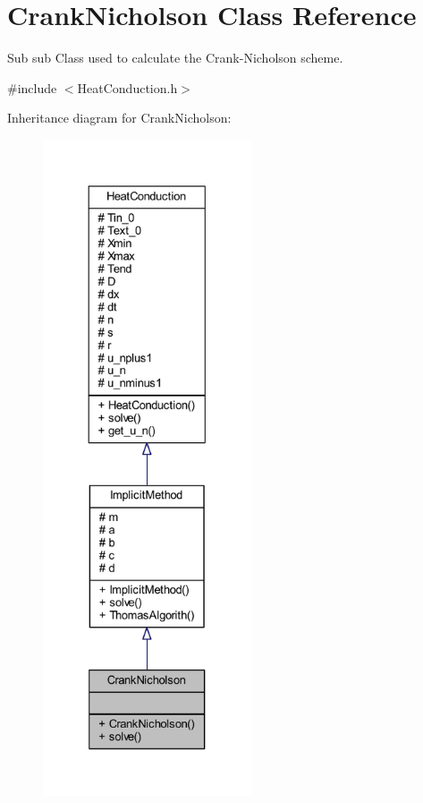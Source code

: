 \hypertarget{class_crank_nicholson}{}\section{Crank\+Nicholson Class Reference}
\label{class_crank_nicholson}


Sub sub Class used to calculate the Crank-\/\+Nicholson scheme.  




{\ttfamily \#include $<$Heat\+Conduction.\+h$>$}



Inheritance diagram for Crank\+Nicholson\+:
\nopagebreak
\begin{figure}[H]
\begin{center}
\leavevmode
\includegraphics[height=550pt]{class_crank_nicholson__inherit__graph}
\end{center}
\end{figure}


